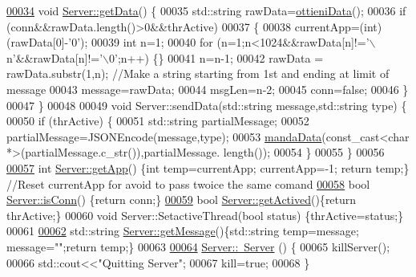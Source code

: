 \begin{DoxyCode}
\hypertarget{Server_8cpp_source_l00034}{}\hyperlink{classServer_a212514d665699ff74c168b81303be815}{00034} \textcolor{keywordtype}{void} \hyperlink{classServer_a212514d665699ff74c168b81303be815}{Server::getData}() \{
00035     std::string rawData=\hyperlink{ServerUtil_8cpp_af4ec6cff50fa0e44047464b9b8c912d4}{ottieniData}();
00036     \textcolor{keywordflow}{if} (conn&&rawData.length()>0&&thrActive)
00037     \{
00038         currentApp=(int)(rawData[0]-\textcolor{charliteral}{'0'});
00039         \textcolor{keywordtype}{int} n=1;
00040         \textcolor{keywordflow}{for} (n=1;n<1024&&rawData[n]!=\textcolor{charliteral}{'\(\backslash\)n'}&&rawData[n]!=\textcolor{charliteral}{'\(\backslash\)0'};n++) \{\}
00041         n=n-1;
00042         rawData = rawData.substr(1,n); \textcolor{comment}{//Make a string starting from 1st and
       ending at limit of message}
00043         message=rawData;
00044         msgLen=n-2;
00045         conn=\textcolor{keyword}{false};
00046     \}
00047 \}
00048 
00049 \textcolor{keywordtype}{void} Server::sendData(std::string message,std::string type) \{
00050     \textcolor{keywordflow}{if} (thrActive) \{
00051         std::string partialMessage;
00052         partialMessage=JSONEncode(message,type);
00053         \hyperlink{ServerUtil_8cpp_a7329f619144deb41baf72e83a7073701}{mandaData}(const\_cast<char *>(partialMessage.c\_str()),partialMessage.
      length());
00054     \}
00055 \}
00056 
\hypertarget{Server_8cpp_source_l00057}{}\hyperlink{classServer_abf528e3dd8190943593c4094b20201f2}{00057} \textcolor{keywordtype}{int} \hyperlink{classServer_abf528e3dd8190943593c4094b20201f2}{Server::getApp}() \{\textcolor{keywordtype}{int} temp=currentApp; currentApp=-1; \textcolor{keywordflow}{return} temp;\} \textcolor{comment}{//Reset
       currentApp for avoid to pass twoice the same comand}
\hypertarget{Server_8cpp_source_l00058}{}\hyperlink{classServer_a343411b66598c4a18a85ff8ed3bc70d3}{00058} \textcolor{keywordtype}{bool} \hyperlink{classServer_a343411b66598c4a18a85ff8ed3bc70d3}{Server::isConn}() \{\textcolor{keywordflow}{return} conn;\}
\hypertarget{Server_8cpp_source_l00059}{}\hyperlink{classServer_a23b2a4e9819bd2ad2dbb6a0ccc63adc2}{00059} \textcolor{keywordtype}{bool} \hyperlink{classServer_a23b2a4e9819bd2ad2dbb6a0ccc63adc2}{Server::getActived}()\{\textcolor{keywordflow}{return} thrActive;\}
00060 \textcolor{keywordtype}{void} Server::SetactiveThread(\textcolor{keywordtype}{bool} status) \{thrActive=status;\}
00061 
\hypertarget{Server_8cpp_source_l00062}{}\hyperlink{classServer_a968480d1fc8a455f708fdc5ec9f1e7d2}{00062} std::string \hyperlink{classServer_a968480d1fc8a455f708fdc5ec9f1e7d2}{Server::getMessage}()\{std::string temp=message; message=\textcolor{stringliteral}{""};\textcolor{keywordflow}{return} 
      temp;\}
00063 
\hypertarget{Server_8cpp_source_l00064}{}\hyperlink{classServer_a4b3aa2579cb1c8cd1d069582c14d0fa6}{00064} \hyperlink{classServer_a4b3aa2579cb1c8cd1d069582c14d0fa6}{Server::~Server} () \{
00065     killServer();
00066     std::cout<<\textcolor{stringliteral}{"Quitting Server"};
00067     kill=\textcolor{keyword}{true};
00068 \}
\end{DoxyCode}
